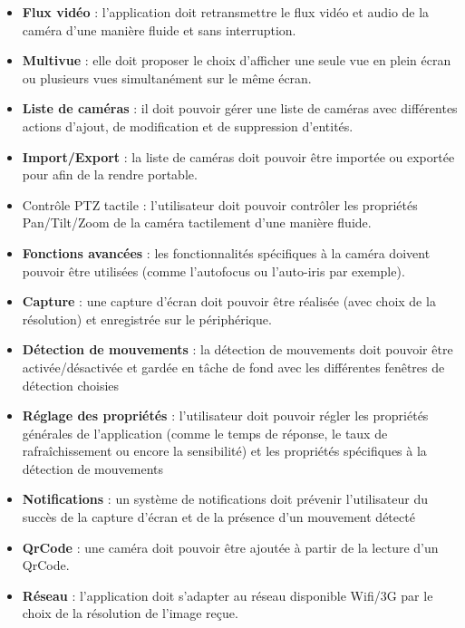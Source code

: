 \begin{itemize}
  \item \textbf{Flux vidéo} : l'application doit retransmettre le flux vidéo et
  audio de la caméra d'une manière fluide et sans interruption.
  \item \textbf{Multivue} : elle doit proposer le choix d'afficher une seule vue en
  plein écran ou plusieurs vues simultanément sur le même écran.
  \item \textbf{Liste de caméras} : il doit pouvoir gérer une liste de caméras avec
  différentes actions d'ajout, de modification et de suppression d'entités.
  \item \textbf{Import/Export} : la liste de caméras doit pouvoir être importée ou
  exportée pour afin de la rendre portable.
  \item {Contrôle PTZ tactile} : l'utilisateur doit pouvoir contrôler les
  propriétés Pan/Tilt/Zoom de la caméra tactilement d'une manière fluide.
  \item \textbf{Fonctions avancées} : les fonctionnalités spécifiques à la caméra
  doivent pouvoir être utilisées (comme l'autofocus ou l'auto-iris par exemple).
  \item \textbf{Capture} : une capture d'écran doit pouvoir être réalisée (avec
  choix de la résolution) et enregistrée sur le périphérique.
  \item \textbf{Détection de mouvements} : la détection de mouvements doit pouvoir
  être activée/désactivée et gardée en tâche de fond avec les différentes fenêtres de détection choisies
  \item \textbf{Réglage des propriétés} : l'utilisateur doit pouvoir régler les
  propriétés générales de l'application (comme le temps de réponse, le taux de rafraîchissement ou encore la sensibilité) et les propriétés spécifiques à la détection de mouvements
  \item \textbf{Notifications} : un système de notifications doit prévenir
  l'utilisateur du succès de la capture d'écran et de la présence d'un mouvement détecté
  \item \textbf{QrCode} : une caméra doit pouvoir être ajoutée à partir de la
  lecture d'un QrCode.
  \item \textbf{Réseau} : l'application doit s'adapter au réseau disponible Wifi/3G
  par le choix de la résolution de l'image reçue.
\end{itemize}

